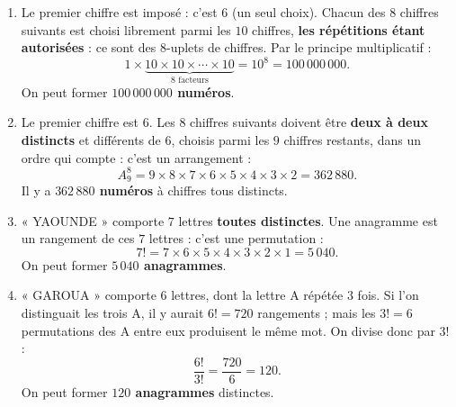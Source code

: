 \documentclass[11pt]{article}
\newcommand{\cle}[1]{{\popxbold\color{popdark}#1}}
\begin{document}
\begin{corrige}
\begin{enumerate}
\item Le premier chiffre est imposé : c'est $6$ (un seul choix). Chacun des $8$ chiffres suivants est choisi librement parmi les $10$ chiffres, \textbf{les répétitions étant autorisées} : ce sont des $8$-uplets de chiffres. Par le principe multiplicatif :
\[ 1\times\underbrace{10\times10\times\cdots\times10}_{8 \text{ facteurs}}=10^8=100\,000\,000. \]
On peut former \textbf{$100\,000\,000$ numéros}.
\item Le premier chiffre est $6$. Les $8$ chiffres suivants doivent être \textbf{deux à deux distincts} et différents de $6$, choisis parmi les $9$ chiffres restants, dans un ordre qui compte : c'est un \cle{arrangement} :
\[ A_9^8=9\times8\times7\times6\times5\times4\times3\times2=362\,880. \]
Il y a \textbf{$362\,880$ numéros} à chiffres tous distincts.
\item « YAOUNDE » comporte $7$ lettres \textbf{toutes distinctes}. Une anagramme est un rangement de ces $7$ lettres : c'est une \cle{permutation} :
\[ 7!=7\times6\times5\times4\times3\times2\times1=5\,040. \]
On peut former \textbf{$5\,040$ anagrammes}.
\item « GAROUA » comporte $6$ lettres, dont la lettre A répétée $3$ fois. Si l'on distinguait les trois A, il y aurait $6!=720$ rangements ; mais les $3!=6$ permutations des A entre eux produisent le même mot. On divise donc par $3!$ :
\[ \frac{6!}{3!}=\frac{720}{6}=120. \]
On peut former \textbf{$120$ anagrammes} distinctes.
\end{enumerate}
\end{corrige}
\end{document}
